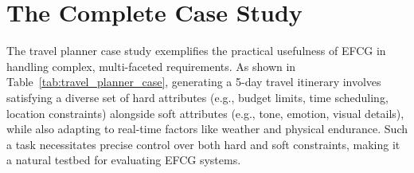\section{The Complete Case Study}
\label{appendix:case_study}

The travel planner case study exemplifies the practical usefulness of EFCG in handling complex, multi-faceted requirements. As shown in Table~\ref{tab:travel_planner_case}, generating a 5-day travel itinerary involves satisfying a diverse set of hard attributes (e.g., budget limits, time scheduling, location constraints) alongside soft attributes (e.g., tone, emotion, visual details), while also adapting to real-time factors like weather and physical endurance. Such a task necessitates precise control over both hard and soft constraints, making it a natural testbed for evaluating EFCG systems.



